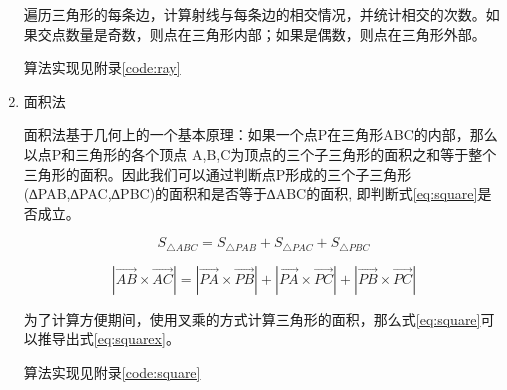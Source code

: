 \begin{enumerate}
遍历三角形的每条边，计算射线与每条边的相交情况，并统计相交的次数。如果交点数量是奇数，则点在三角形内部；如果是偶数，则点在三角形外部。

算法实现见附录\ref{code:ray}


\item 面积法

面积法基于几何上的一个基本原理：如果一个点P在三角形ABC的内部，那么以点P和三角形的各个顶点 A,B,C为顶点的三个子三角形的面积之和等于整个三角形的面积。因此我们可以通过判断点P形成的三个子三角形(∆PAB,∆PAC,∆PBC)的面积和是否等于∆ABC的面积, 即判断式\ref{eq:square}是否成立。

\begin{equation}
    \label{eq:square}
    S_{\bigtriangleup ABC}=S_{\bigtriangleup PAB}+S_{\bigtriangleup PAC}+S_{\bigtriangleup PBC}  
\end{equation}

\begin{equation}
    \label{eq:squarex}
    |\overrightarrow{AB}\times \overrightarrow{AC}|=|\overrightarrow{PA}\times \overrightarrow{PB}|+|\overrightarrow{PA}\times \overrightarrow{PC}|+|\overrightarrow{PB}\times \overrightarrow{PC}|
\end{equation}

为了计算方便期间，使用叉乘的方式计算三角形的面积，那么式\ref{eq:square}可以推导出式\ref{eq:squarex}。


算法实现见附录\ref{code:square}




\end{enumerate}
